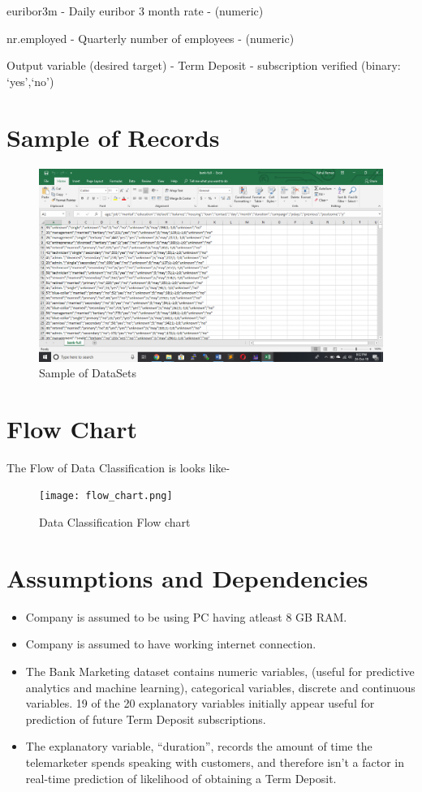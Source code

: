 euribor3m - Daily euribor 3 month rate - (numeric)

nr.employed - Quarterly number of employees - (numeric)

Output variable (desired target) - Term Deposit - subscription verified
(binary: ‘yes’,‘no’)
\section{Sample of Records}
\begin{figure}[h!]
	\centering
	\includegraphics[width=0.75\linewidth]{sample_of_Data.png}
	\caption{Sample of DataSets}
	\label{fig:flowchart}
\end{figure}

\section{Flow Chart}
The Flow of Data Classification is looks like-
\begin{figure}[h!]
	\centering
	\texttt{[image: flow\_chart.png]}
	\caption{Data Classification Flow chart}
	\label{fig:flowchart}
\end{figure}

\section{Assumptions and Dependencies}
\begin{itemize}
	\item Company is assumed to be using PC having  atleast 8 GB RAM.
	\item Company is assumed to have working internet connection.
	\item The Bank Marketing dataset contains numeric variables, (useful for predictive analytics and machine learning), categorical variables, discrete and continuous variables. 19 of the 20 explanatory variables initially appear useful for prediction of future Term Deposit subscriptions.
	\item The explanatory variable, “duration”, records the amount of time the telemarketer spends speaking with customers, and therefore isn’t a factor in real-time prediction of likelihood of obtaining a Term Deposit. \\
	\\
\end{itemize}
